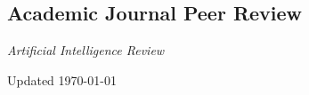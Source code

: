 \documentclass[11pt,letterpaper]{report}
\newcommand{\listitemspace}{0.25em}
\renewenvironment{itemize}
{\begin{list}{}{\setlength{\leftmargin}{0em}
                \setlength{\parskip}{0em}
                \setlength{\itemsep}{\listitemspace}
                \setlength{\parsep}{\listitemspace}}}
{\end{list}}
\begin{document}
    \subsection*{Academic Journal Peer Review}

    \begin{itemize}

        \item \textit{Artificial Intelligence Review}

    \end{itemize}

    \begin{center}
        \vfill
        Updated \monthyeardate\today
    \end{center}
\end{document}
